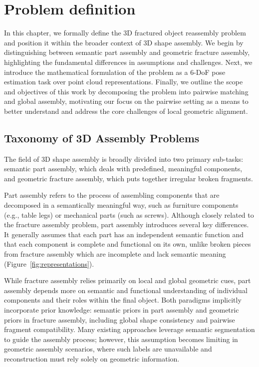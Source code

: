 \chapter{Problem definition}
\label{chap:ch2}

In this chapter, we formally define the 3D fractured object reassembly problem and position it within the broader context of 3D shape assembly. We begin by distinguishing between semantic part assembly and geometric fracture assembly, highlighting the fundamental differences in assumptions and challenges. Next, we introduce the mathematical formulation of the problem as a 6-DoF pose estimation task over point cloud representations. Finally, we outline the scope and objectives of this work by decomposing the problem into pairwise matching and global assembly, motivating our focus on the pairwise setting as a means to better understand and address the core challenges of local geometric alignment.

\section{Taxonomy of 3D Assembly Problems}
The field of 3D shape assembly is broadly divided into two primary sub-tasks: semantic part assembly, which deals with predefined, meaningful components, and geometric fracture assembly, which puts together irregular broken fragments.

Part assembly refers to the process of assembling components that are decomposed in a semantically meaningful way, such as furniture components (e.g., table legs) or mechanical parts (such as screws). Although closely related to the fracture assembly problem, part assembly introduces several key differences. It generally assumes that each part has an independent semantic function and that each component is complete and functional on its own, unlike broken pieces from fracture assembly which are incomplete and lack semantic meaning (Figure~\ref{fig:representations}).

While fracture assembly relies primarily on local and global geometric cues, part assembly depends more on semantic and functional understanding of individual components and their roles within the final object. Both paradigms implicitly incorporate prior knowledge: semantic priors in part assembly and geometric priors in fracture assembly, including global shape consistency and pairwise fragment compatibility. Many existing approaches leverage semantic segmentation to guide the assembly process; however, this assumption becomes limiting in geometric assembly scenarios, where such labels are unavailable and reconstruction must rely solely on geometric information.


